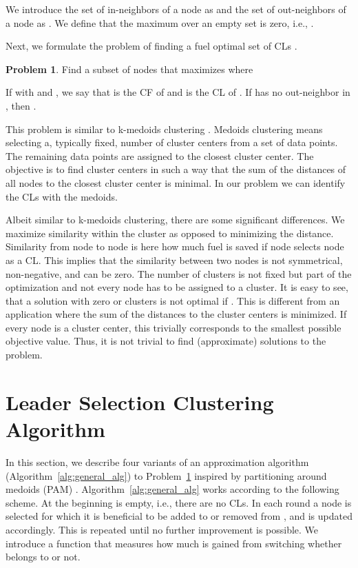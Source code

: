 \documentclass[letterpaper,10pt,conference,twocolumn]{IEEEtran}
\theoremstyle{definition}
\newtheorem{problem}{Problem}
\begin{document}
We introduce the set of in-neighbors of a node  as  and the set of out-neighbors of a node  as . We define that the maximum over an empty set is zero, i.e., . 

Next, we formulate the problem of finding a fuel optimal set of CLs .
\begin{problem}\label{prob:clustering}
Find a subset  of nodes that maximizes  where

\end{problem}
If  with  and , we say that  is the CF of  and  is the CL of . If  has no out-neighbor in , then . 

This problem is similar to k-medoids clustering \cite{pam_book}. Medoids clustering means selecting a, typically fixed, number of cluster centers from a set of data points. The remaining data points are assigned to the closest cluster center. The objective is to find cluster centers in such a way that the sum of the distances of all nodes to the closest cluster center is minimal. In our problem we can identify the CLs with the medoids. 

Albeit similar to k-medoids clustering, there are some significant differences. We maximize similarity within the cluster as opposed to minimizing the distance. Similarity from node  to node  is here how much fuel is saved if node  selects node  as a CL. This implies that the similarity between two nodes is not symmetrical, non-negative, and can be zero.  The number of clusters is not fixed but part of the optimization and not every node has to be assigned to a cluster. It is easy to see, that a solution with zero or  clusters is not optimal if . This is different from an application where the sum of the distances to the cluster centers is minimized. If every node is a cluster center, this trivially corresponds to the smallest possible objective value. Thus, it is not trivial to find (approximate) solutions to the problem.


\section{Leader Selection Clustering Algorithm}
\label{sec:approxmation_algs}

In this section, we describe four variants of an approximation algorithm (Algorithm~\ref{alg:general_alg}) to Problem~\ref{prob:clustering} inspired by partitioning around medoids (PAM) \cite{pam_book}. 
Algorithm~\ref{alg:general_alg} works according to the following scheme. At the beginning  is empty, i.e., there are no CLs. In each round a node  is selected for which it is beneficial to be added to  or removed from , and  is updated accordingly. This is repeated until no further improvement is possible. We introduce a function  that measures how much is gained from switching whether  belongs to  or not.
\end{document}
